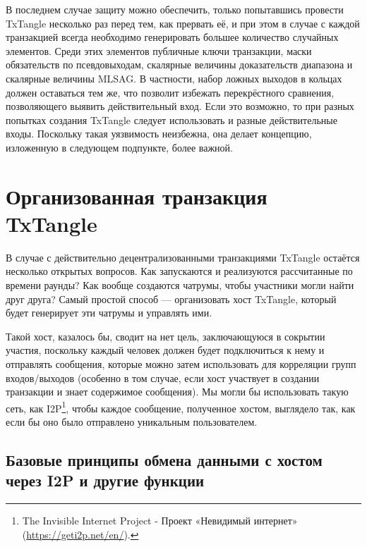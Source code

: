 В последнем случае защиту можно обеспечить, только попытавшись провести TxTangle не\-сколько раз перед тем, как прервать её, и при этом в случае с каждой транзакцией всегда необходимо генерировать большее количество случайных элементов. Среди этих элементов публичные ключи транзакции, маски обязательств по псевдовыходам, скалярные величины доказательств диапазона и скалярные величины MLSAG. В частности, набор ложных выходов в кольцах должен оставаться тем же, что позволит избежать перекрёстного сравнения, поз\-воляющего выявить действительный вход.  Если это возможно, то при разных попытках создания TxTangle следует использовать и разные действительные входы. Поскольку такая уязвимость неизбежна, она делает концепцию, изложенную в следующем подпункте, более важной.



\section{Организованная транзакция TxTangle}
\label{sec:hosted-txtangle}

В случае с действительно децентрализованными транзакциями TxTangle остаётся несколько открытых вопросов. Как запускаются и реализуются рассчитанные по времени раунды? Как вообще создаются чатрумы, чтобы участники могли найти друг друга? Самый простой способ — организовать хост TxTangle, который будет генерирует эти чатрумы и управлять ими.

Такой хост, казалось бы, сводит на нет цель, заключающуюся в сокрытии участия, поскольку каждый человек должен будет подключиться к нему и отправлять сообщения, которые можно затем использовать для корреляции групп входов/выходов (особенно в том случае, если хост участвует в создании транзакции и знает содержимое сообщения). Мы могли бы использовать такую сеть, как I2P\footnote{The Invisible Internet Project - Проект «Невидимый интернет» (\url{https://geti2p.net/en/}).}, чтобы каждое сообщение, полученное хостом, выглядело так, как если бы оно было отправлено уникальным пользователем.


\subsection{Базовые принципы обмена данными с хостом через I2P и другие функции}
\label{subsec:txtangle-host-communication}

